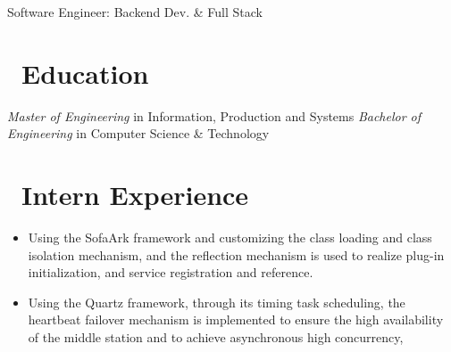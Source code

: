 \documentclass{resume}
\begin{document}


\vspace{-0.5ex}
\centerline{Software Engineer: Backend Dev. \& Full Stack}
\vspace{1ex}
\vspace{-1.5ex}
 
\section{\faGraduationCap\ Education}
\vspace{-0.5ex}
\textit{Master of Engineering} in Information, Production and Systems
\vspace{-1ex}
\vspace{-0.5ex}
\textit{Bachelor of Engineering} in Computer Science \& Technology
\vspace{-0.6ex}

\section{\faSitemap\ Intern Experience}
\vspace{-0.5ex}
\begin{itemize}
  \item Using the SofaArk framework and customizing the class loading and class isolation mechanism, and the reflection mechanism is used to realize plug-in initialization, and service registration and reference.
  \item Using the Quartz framework, through its timing task scheduling, the heartbeat failover mechanism is implemented to ensure the high availability of the middle station and to achieve asynchronous high concurrency,
\end{itemize}
\vspace{-2.5ex}
\end{document}
